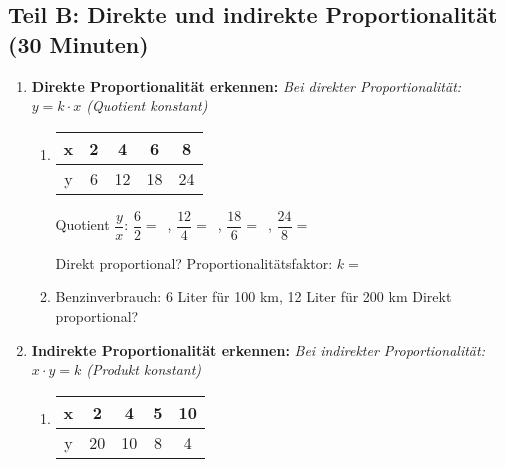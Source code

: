 \subsection*{Teil B: Direkte und indirekte Proportionalität (30 Minuten)}

\begin{enumerate}[label=\arabic*.]

    \item \textbf{Direkte Proportionalität erkennen:}
    \textit{Bei direkter Proportionalität: $y = k \cdot x$ (Quotient konstant)}
    \vspace{0.5cm}

    \begin{enumerate}[label=\alph*)]
        \item \begin{tabular}{|c|c|c|c|c|}
            \hline
            x & 2 & 4 & 6 & 8 \\
            \hline
            y & 6 & 12 & 18 & 24 \\
            \hline
        \end{tabular}

        Quotient $\dfrac{y}{x}$: $\dfrac{6}{2} = \phantom{0}$, $\dfrac{12}{4} = \phantom{0}$, $\dfrac{18}{6} = \phantom{0}$, $\dfrac{24}{8} = \phantom{0}$

        Direkt proportional? \underline{\hspace{2cm}} Proportionalitätsfaktor: $k = \phantom{0}$
        \vspace{0.5cm}

        \item Benzinverbrauch: 6 Liter für 100 km, 12 Liter für 200 km
        Direkt proportional? \underline{\hspace{2cm}}
    \end{enumerate}

    \vspace{1cm}

    \item \textbf{Indirekte Proportionalität erkennen:}
    \textit{Bei indirekter Proportionalität: $x \cdot y = k$ (Produkt konstant)}
    \vspace{0.5cm}

    \begin{enumerate}[label=\alph*)]
        \item \begin{tabular}{|c|c|c|c|c|}
            \hline
            x & 2 & 4 & 5 & 10 \\
            \hline
            y & 20 & 10 & 8 & 4 \\
            \hline
        \end{tabular}


\end{enumerate}
\end{enumerate}
